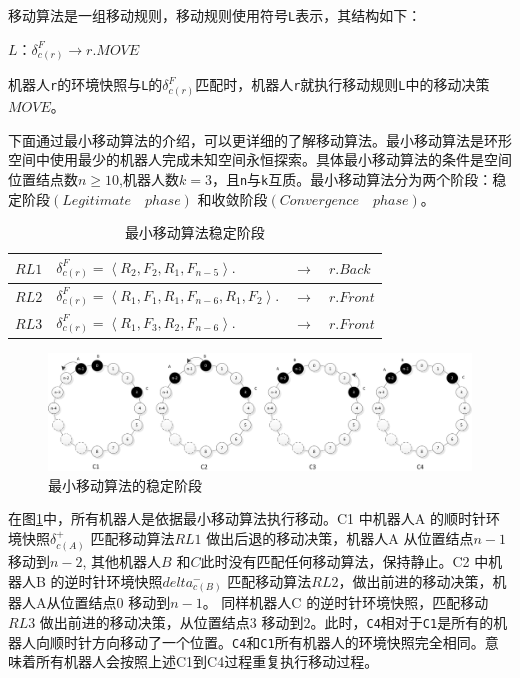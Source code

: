 移动算法是一组移动规则，移动规则使用符号\verb|L|表示，其结构如下：

 $ L ：\delta_{c\left(r\right)}^F  \rightarrow  r.MOVE $

机器人\verb|r|的环境快照与\verb|L|的$\delta_{c\left(r\right)}^F$匹配时，机器人\verb|r|就执行移动规则\verb|L|中的移动决策$MOVE$。

下面通过最小移动算法\cite{r5}的介绍，可以更详细的了解移动算法。最小移动算法是环形空间中使用最少的机器人完成未知空间永恒探索\cite{r5}。具体最小移动算法的条件是空间位置结点数$n \geq 10$,机器人数$k = 3$，且\verb|n|与\verb|k|互质。最小移动算法分为两个阶段：稳定阶段$\left(Legitimate\quad phase\right)$ 和收敛阶段$\left(Convergence\quad phase\right)$。

\begin{table}[hbt]
    \centering
    \caption{最小移动算法稳定阶段}
    \begin{tabular}{|p{2cm}|p{8cm}|p{2cm}|p{2cm}|}
        \hline
        $RL1$&$\delta_{c\left(r\right)}^F = \left\langle R_2,F_2,R_1,F_{n-5} \right\rangle.$&$\rightarrow$&$r.Back$\\
        \hline
        $RL2$&$\delta_{c\left(r\right)}^F = \left\langle R_1,F_1,R_1,F_{n-6},R_1,F_2 \right\rangle.$&$\rightarrow$&$r.Front$\\
        \hline
        $RL3$&$\delta_{c\left(r\right)}^F = \left\langle R_1,F_3,R_2,F_{n-6}\right\rangle.$&$\rightarrow$&$r.Front$\\
        \hline
    \end{tabular}
    \label{table:minalgotithm}
\end{table}

\vspace{0.5cm}

\begin{figure}[!hbt]
	\centering
	\includegraphics[width=6.5 in]{fig/perpetualexploration.png}
	\caption{最小移动算法的稳定阶段}
	\label{fig:perpetualexploration}
\end{figure}

在图\ref{fig:perpetualexploration}中，所有机器人是依据最小移动算法执行移动。C1 中机器人A 的顺时针环境快照$\delta_{c\left( A\right)}^+$ 匹配移动算法$RL1$ 做出后退的移动决策，机器人A 从位置结点$n-1$移动到$n-2$, 其他机器人$B$ 和$C$此时没有匹配任何移动算法，保持静止。C2 中机器人B 的逆时针环境快照${delta_{c\left( B\right)}^-}$ 匹配移动算法$RL2$，做出前进的移动决策，机器人A从位置结点$0$ 移动到$n-1$。 同样机器人C 的逆时针环境快照，匹配移动$RL3$ 做出前进的移动决策，从位置结点$3$ 移动到$2$。此时，\verb|C4|相对于\verb|C1|是所有的机器人向顺时针方向移动了一个位置。\verb|C4|和\verb|C1|所有机器人的环境快照完全相同。意味着所有机器人会按照上述C1到C4过程重复执行移动过程。

